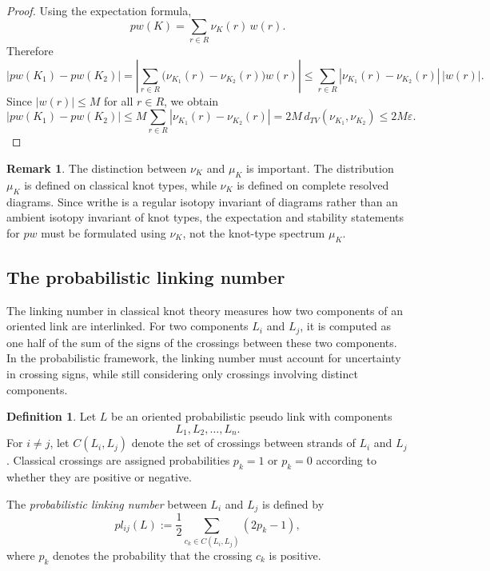 \documentclass[a4paper, reqno, 12pt]{amsart}
\theoremstyle{plain}
\theoremstyle{definition}
\newtheorem{definition}[theorem]{Definition}
\newtheorem{remark}[theorem]{Remark}
\begin{document}
\begin{proof}
Using the expectation formula,
\[
pw(K)=\sum_{r\in R}\nu_K(r)\,w(r).
\]
Therefore
\[
|pw(K_1)-pw(K_2)|
=
\left|
\sum_{r\in R}
\big(\nu_{K_1}(r)-\nu_{K_2}(r)\big)w(r)
\right|
\le
\sum_{r\in R}
|\nu_{K_1}(r)-\nu_{K_2}(r)|\,|w(r)|.
\]
Since \(|w(r)|\le M\) for all \(r\in R\), we obtain
\[
|pw(K_1)-pw(K_2)|
\le
M\sum_{r\in R}
|\nu_{K_1}(r)-\nu_{K_2}(r)|
=
2M\,d_{TV}(\nu_{K_1},\nu_{K_2})
\le 2M\varepsilon.
\]
\end{proof}

\begin{remark}\rm
The distinction between \(\nu_K\) and \(\mu_K\) is important. The distribution \(\mu_K\) is defined on classical knot types, while \(\nu_K\) is defined on complete resolved diagrams. Since writhe is a regular isotopy invariant of diagrams rather than an ambient isotopy invariant of knot types, the expectation and stability statements for \(pw\) must be formulated using \(\nu_K\), not the knot-type spectrum \(\mu_K\).
\end{remark}






\subsection{The probabilistic linking number}

The linking number in classical knot theory measures how two components of an oriented link are interlinked. For two components \(L_i\) and \(L_j\), it is computed as one half of the sum of the signs of the crossings between these two components. In the probabilistic framework, the linking number must account for uncertainty in crossing signs, while still considering only crossings involving distinct components.

\begin{definition}\rm \label{dpl}
Let \(L\) be an oriented probabilistic pseudo link with components
\[
L_1,L_2,\ldots,L_n.
\]
For \(i\neq j\), let \(C(L_i,L_j)\) denote the set of crossings between strands of \(L_i\) and \(L_j\). Classical crossings are assigned probabilities \(p_k=1\) or \(p_k=0\) according to whether they are positive or negative.

The \emph{probabilistic linking number} between \(L_i\) and \(L_j\) is defined by
\[
pl_{ij}(L)
:=
\frac12
\sum_{c_k\in C(L_i,L_j)}
(2p_k-1),
\]
where \(p_k\) denotes the probability that the crossing \(c_k\) is positive.
\end{definition}
\end{document}
